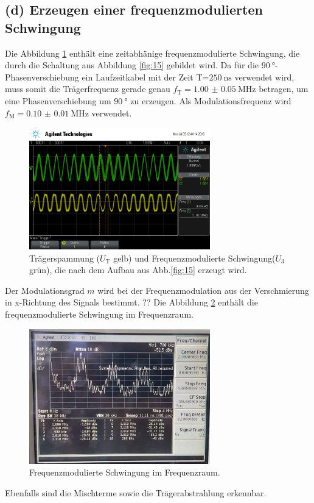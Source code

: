 \subsection{(d) Erzeugen einer frequenzmodulierten Schwingung}
\label{subsec:auswertung_d}
Die Abbildung \ref{fig:freq_zeit} enthält eine zeitabhänige frequenzmodulierte
Schwingung, die durch die Schaltung aus Abbildung \ref{fig:15}
gebildet wird.
Da für die  $\SI{90}{\degree}$-Phasenverschiebung ein Laufzeitkabel mit der
Zeit T=$\SI{250}{\nano\second}$ verwendet wird, muss somit die
Trägerfrequenz gerade genau $f_{\text{T}} = \SI{1.00(5)}{\mega\hertz}$
betragen, um eine Phasenverschiebung um $\SI{90}{\degree}$
zu erzeugen. Als Modulationsfrequenz wird
$f_{\text{M}}=\SI{0.10(1)}{\mega\hertz}$ verwendet.

\begin{figure}
  \centering
  \includegraphics[width=0.7\textwidth]{osci/freq_mod.png}
  \caption{Trägerspammung ($U_{\text{T}}$ gelb) und Frequenzmodulierte
  Schwingung($U_3$ grün), die nach dem Aufbau aus Abb.\ref{fig:15} erzeugt wird.}
  \label{fig:freq_zeit}
\end{figure}
Der Modulationsgrad $m$ wird bei der Frequenzmodulation
aus der Verschmierung in x-Richtung des Signals bestimmt.
??
Die Abbildung \ref{fig:frequenz_freq} enthält die frequenzmodulierte Schwingung
im Frequenzraum.
\begin{figure}
  \centering
  \includegraphics[width=0.7\textwidth]{spec/frequenzmodulation_bereich_fresh_cool.jpg}
  \caption{Frequenzmodulierte
Schwingung im Frequenzraum.}
\label{fig:frequenz_freq}
\end{figure}
Ebenfalls sind die Mischterme sowie die Trägerabstrahlung erkennbar.



